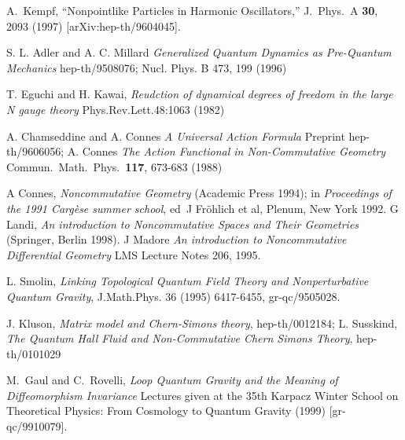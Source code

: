 \documentclass[a4paper,11pt]{article}
\begin{document}
\begin{thebibliography}{99}
A.~Kempf, ``Nonpointlike Particles in Harmonic Oscillators,'' J.\
Phys.\ A {\bf 30}, 2093 (1997) [arXiv:hep-th/9604045].

S. L. Adler and A. C. Millard {\it Generalized Quantum Dynamics as
Pre-Quantum Mechanics} hep-th/9508076; Nucl. Phys. B 473, 199
(1996)

T. Eguchi and  H. Kawai, {\it Reudction of dynamical degrees of
freedom in the large N gauge theory}
 Phys.Rev.Lett.48:1063 (1982)


A. Chamseddine and A. Connes {\it A Universal Action Formula}
Preprint hep-th/9606056; A. Connes {\it The Action Functional in
Non-Commutative Geometry} Commun.\ Math.\ Phys.\ {\bf 117},
673-683 (1988)

 A Connes, {\em Noncommutative Geometry} (Academic
Press 1994); in {\em Proceedings of the 1991 Carg\`ese summer
school}, ed~J Fr\"ohlich et al, Plenum, New York 1992.  G Landi,
{\em An introduction to Noncommutative Spaces and Their
Geometries} (Springer, Berlin 1998).  J Madore {\em An
introduction to Noncommutative Differential Geometry} LMS Lecture
Notes 206, 1995.

L. Smolin, {\it Linking Topological Quantum Field Theory and
Nonperturbative Quantum Gravity}, J.Math.Phys. 36 (1995)
6417-6455, gr-qc/9505028.

J. Kluson, {\it Matrix model and Chern-Simons theory},
hep-th/0012184; L. Susskind, {\it The Quantum Hall Fluid and
Non-Commutative Chern Simons Theory}, hep-th/0101029

M.~Gaul and C.~Rovelli, {\it Loop Quantum Gravity and the Meaning
of Diffeomorphism Invariance} Lectures given at the 35th Karpacz
Winter School on Theoretical Physics: From Cosmology to Quantum
Gravity (1999) [gr-qc/9910079].








\end{thebibliography}
\end{document}
